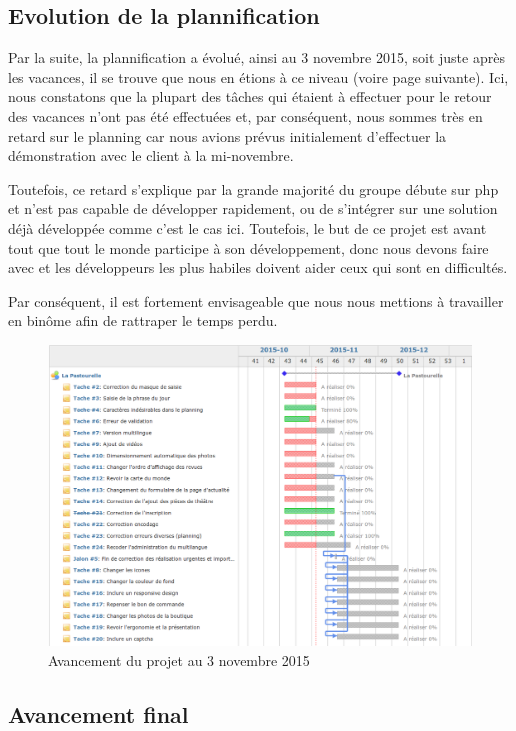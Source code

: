 \documentclass[11pt]{report}
\begin{document}
\subsection{Evolution de la plannification}
Par la suite, la plannification a évolué, ainsi au 3 novembre 2015, soit juste
après les vacances, il se trouve que nous en étions à ce niveau (voire page
suivante). Ici, nous constatons que la plupart des tâches qui étaient à
effectuer pour le retour des vacances n'ont pas été effectuées et, par
conséquent, nous sommes très en retard sur le planning car nous avions prévus
initialement d'effectuer la démonstration avec le client à la mi-novembre.
\par Toutefois, ce retard s'explique par la grande majorité du groupe débute sur
php et n'est pas capable de développer rapidement, ou de s'intégrer sur une
solution déjà développée comme c'est le cas ici. Toutefois, le but de ce projet
est avant tout que tout le monde participe à son développement, donc nous devons
faire avec et les développeurs les plus habiles doivent aider ceux qui sont en
difficultés. 
\par Par conséquent, il est fortement envisageable que nous nous mettions à
travailler en binôme afin de rattraper le temps perdu.
\begin{landscape}
\begin{figure}[t]
    \caption{Avancement du projet au 3 novembre 2015}
   \includegraphics[scale=0.5]{include/gantt3-11.png}
\end{figure}
\end{landscape}

\subsection{Avancement final}
\end{document}
